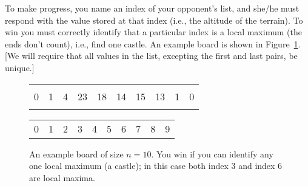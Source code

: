 \documentclass[10pt]{article}
\begin{document}
To make progress, you name an index of your opponent's list, and she/he must respond with the value stored at that index (i.e., the altitude of the terrain). To win you must correctly identify that a particular index is a local maximum (the ends don't count), i.e., find one castle. An example board is shown in Figure~\ref{fig:board}. [We will require that all values in the list, excepting the first and last pairs, be unique.]

\begin{figure}[h]
    \centering
        \begin{tabularx}{0.7\textwidth}{ | *{10}{Y|} }
                \hline
                  &   &   &    &    &    &    &    &   & \\
                0 & 1 & 4 & 23 & 18 & 14 & 15 & 13 & 1 & 0\\
                  &   &   &    &    &    &    &    &   & \\
                \hline
        \end{tabularx}
        {\small\begin{tabularx}{0.7\textwidth}{  *{10}{Y} }
                0 & 1 & 2 & 3 & 4 & 5 & 6 & 7 & 8 & 9
        \end{tabularx}}

    \caption{An example board of size $n=10$. You win if you can identify any one local maximum (a castle); in this case both index $3$ and index $6$ are local maxima.}
    \label{fig:board}
\end{figure}
\end{document}
